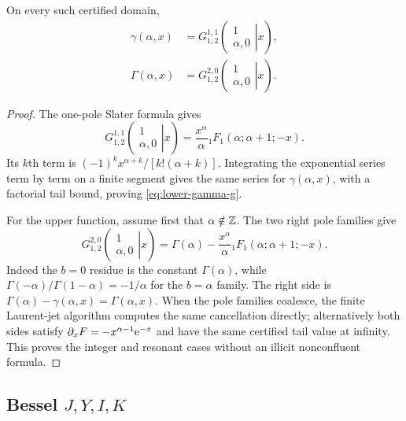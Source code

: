 \begin{theorem}\label{thm:incomplete-gamma-g}
On every such certified domain,
\begin{align}
 \gamma(\alpha,x)
 &=G_{1,2}^{1,1}\!\left(
   \left.\begin{matrix}1\\\alpha,0\end{matrix}\right|x\right),
 \label{eq:lower-gamma-g}\\
 \Gamma(\alpha,x)
 &=G_{1,2}^{2,0}\!\left(
   \left.\begin{matrix}1\\\alpha,0\end{matrix}\right|x\right).
 \label{eq:upper-gamma-g}
\end{align}
\end{theorem}
\begin{proof}
The one-pole Slater formula gives
\begin{equation}\label{eq:lower-hyp}
G_{1,2}^{1,1}\!\left(
 \left.\begin{matrix}1\\\alpha,0\end{matrix}\right|x\right)
 =\frac{x^\alpha}{\alpha}{}_1F_1(\alpha;\alpha+1;-x).
\end{equation}
Its $k$th term is $(-1)^kx^{\alpha+k}/[k!(\alpha+k)]$.  Integrating the
exponential series term by term on a finite segment gives the same series for
$\gamma(\alpha,x)$, with a factorial tail bound, proving
\eqref{eq:lower-gamma-g}.

For the upper function, assume first that $\alpha\notin\mathbb Z$.  The two right pole
families give
\[
G_{1,2}^{2,0}\!\left(
 \left.\begin{matrix}1\\\alpha,0\end{matrix}\right|x\right)
 =\Gamma(\alpha)-\frac{x^\alpha}{\alpha}
 {}_1F_1(\alpha;\alpha+1;-x).
\]
Indeed the $b=0$ residue is the constant $\Gamma(\alpha)$, while
$\Gamma(-\alpha)/\Gamma(1-\alpha)=-1/\alpha$ for the $b=\alpha$ family.
The right side is $\Gamma(\alpha)-\gamma(\alpha,x)=\Gamma(\alpha,x)$.
When the pole families coalesce, the finite Laurent-jet algorithm computes the
same cancellation directly; alternatively both sides satisfy
$\partial_xF=-x^{\alpha-1}\mathrm e^{-x}$ and have the same certified tail value at
infinity.  This proves the integer and resonant cases without an illicit
nonconfluent formula.
\end{proof}

\subsection{Bessel \texorpdfstring{$J,Y,I,K$}{J, Y, I, K}}

